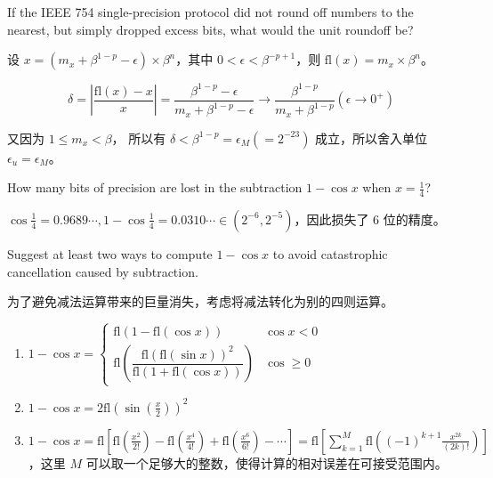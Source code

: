 \documentclass[lang=cn,a4paper,newtx,bibend=bibtex]{elegantpaper}
\begin{document}
\begin{prob}[4.4.1-\textrm{V}.]
  If the IEEE 754 single-precision protocol did not round
  off numbers to the nearest, but simply dropped excess
  bits, what would the unit roundoff be?
\end{prob}

\begin{solution}
  设 $x = (m_x + \beta^{1-p} - \epsilon) \times \beta^n$，其中 $0 < \epsilon < \beta^{-p+1}$，则 $\text{fl}(x) = m_x \times \beta^n$。

  \[\delta = \left|\dfrac{\text{fl}(x) - x}{x}\right| = \dfrac{\beta^{1-p}-\epsilon}{m_x + \beta^{1-p}-\epsilon} \rightarrow \dfrac{\beta^{1-p}}{m_x + \beta^{1-p}} (\epsilon \rightarrow 0^+)\]

  又因为 $1\le m_x < \beta$， 所以有 $\delta < \beta^{1-p} = \epsilon_M (= 2^{-23})$ 成立，所以舍入单位 $\epsilon_u = \epsilon_M$。
\end{solution}


\begin{prob}[4.4.1-\textrm{VI}.]
  How many bits of precision are lost in the subtraction
  $1-\cos x$ when $x = \frac14$?
\end{prob}

\begin{solution}
  $\cos \frac14 = 0.9689\cdots, 1 - \cos \frac14 = 0.0310\cdots \in (2^{-6}, 2^{-5})$，因此损失了 6 位的精度。
\end{solution}

\begin{prob}
  Suggest at least two ways to compute $1 - \cos x$ to avoid
  catastrophic cancellation caused by subtraction.
\end{prob}

\begin{solution}
  为了避免减法运算带来的巨量消失，考虑将减法转化为别的四则运算。
  \begin{enumerate}
    \item $1-\cos x = \begin{cases} \text{fl}(1-\text{fl}(\cos x)) & \cos x < 0 \\ \text{fl}\left(\dfrac{\text{fl}(\text{fl}(\sin x))^2}{\text{fl}(1 + \text{fl}(\cos x))}\right) & \cos \ge 0\end{cases}$
    \item $1 - \cos x = 2\text{fl}(\sin (\frac{x}2))^2$
    \item $1 - \cos x = \text{fl}[\text{fl}(\frac{x^2}{2!}) - \text{fl}(\frac{x^4}{4!}) + \text{fl}(\frac{x^6}{6!}) - \cdots ] = \text{fl}\left[\sum_{k = 1}^{M} \text{fl}\left((-1)^{k+1}\frac{x^{2k}}{(2k)!}\right)\right]$，这里 $M$ 可以取一个足够大的整数，使得计算的相对误差在可接受范围内。
  \end{enumerate}
\end{solution}
\end{document}
